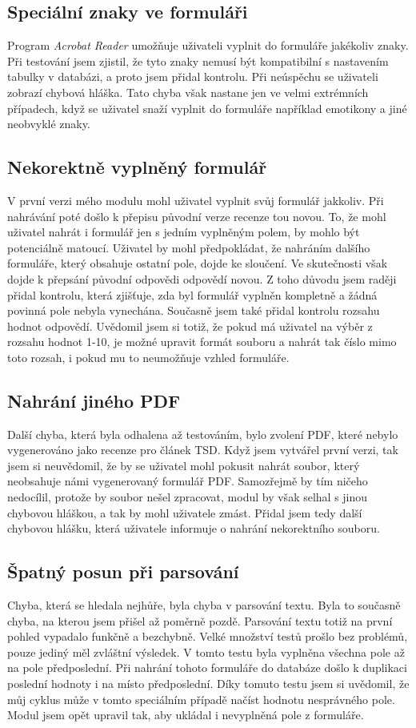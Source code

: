 \documentclass[czech,BP]{thesiskiv}
\begin{document}
\subsection{Speciální znaky ve formuláři}
Program \emph{Acrobat Reader} umožňuje uživateli vyplnit do formuláře jakékoliv znaky. Při testování jsem zjistil, že tyto znaky nemusí být kompatibilní s nastavením tabulky v databázi, a proto jsem přidal kontrolu. Při neúspěchu se uživateli zobrazí chybová hláška. Tato chyba však nastane jen ve velmi extrémních případech, když se uživatel snaží vyplnit do formuláře například emotikony a jiné neobvyklé znaky. 
\subsection{Nekorektně vyplněný formulář}
V první verzi mého modulu mohl uživatel vyplnit svůj formulář jakkoliv. Při nahrávání poté došlo k přepisu původní verze recenze tou novou. To, že mohl uživatel nahrát i formulář jen s jedním vyplněným polem, by mohlo být potenciálně matoucí. Uživatel by mohl předpokládat, že nahráním dalšího formuláře, který obsahuje ostatní pole, dojde ke sloučení. Ve skutečnosti však dojde k přepsání původní odpovědi odpovědí novou. Z toho důvodu jsem raději přidal kontrolu, která zjišťuje, zda byl formulář vyplněn kompletně a žádná povinná pole nebyla vynechána. Současně jsem také přidal kontrolu rozsahu hodnot odpovědí. Uvědomil jsem si totiž, že pokud má uživatel na výběr z rozsahu hodnot 1-10, je možné upravit formát souboru a nahrát tak číslo mimo toto rozsah, i pokud mu to neumožňuje vzhled formuláře. 
\subsection{Nahrání jiného PDF}
Další chyba, která byla odhalena až testováním, bylo zvolení PDF, které nebylo vygenerováno jako recenze pro článek TSD. Když jsem vytvářel první verzi, tak jsem si neuvědomil, že by se uživatel mohl pokusit nahrát soubor, který neobsahuje námi vygenerovaný formulář PDF. Samozřejmě by tím ničeho nedocílil, protože by soubor nešel zpracovat, modul by však selhal s jinou chybovou hláškou, a tak by mohl uživatele zmást. Přidal jsem tedy další chybovou hlášku, která uživatele informuje o nahrání nekorektního souboru. 
\subsection{Špatný posun při parsování}
Chyba, která se hledala nejhůře, byla chyba v parsování textu. Byla to současně chyba, na kterou jsem přišel až poměrně pozdě. Parsování textu totiž na první pohled vypadalo funkčně a bezchybně. Velké množství testů prošlo bez problémů, pouze jediný měl zvláštní výsledek. V tomto testu byla vyplněna všechna pole až na pole předposlední. Při nahrání tohoto formuláře do databáze došlo k duplikaci poslední hodnoty i na místo předposlední. Díky tomuto testu jsem si uvědomil, že můj cyklus může v tomto speciálním případě načíst hodnotu nesprávného pole. Modul jsem opět upravil tak, aby ukládal i nevyplněná pole z formuláře. 
\end{document}
